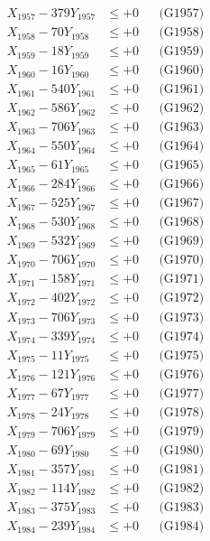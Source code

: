 \documentclass[a4paper,10pt]{article}
\begin{document}
{\begin{align}
X_{1957} - 379Y_{1957} &\leq +0 && \text{(G1957)} \\
X_{1958} - 70Y_{1958} &\leq +0 && \text{(G1958)} \\
X_{1959} - 18Y_{1959} &\leq +0 && \text{(G1959)} \\
X_{1960} - 16Y_{1960} &\leq +0 && \text{(G1960)} \\
\allowbreak
X_{1961} - 540Y_{1961} &\leq +0 && \text{(G1961)} \\
X_{1962} - 586Y_{1962} &\leq +0 && \text{(G1962)} \\
X_{1963} - 706Y_{1963} &\leq +0 && \text{(G1963)} \\
X_{1964} - 550Y_{1964} &\leq +0 && \text{(G1964)} \\
X_{1965} - 61Y_{1965} &\leq +0 && \text{(G1965)} \\
X_{1966} - 284Y_{1966} &\leq +0 && \text{(G1966)} \\
X_{1967} - 525Y_{1967} &\leq +0 && \text{(G1967)} \\
X_{1968} - 530Y_{1968} &\leq +0 && \text{(G1968)} \\
X_{1969} - 532Y_{1969} &\leq +0 && \text{(G1969)} \\
X_{1970} - 706Y_{1970} &\leq +0 && \text{(G1970)} \\
\allowbreak
X_{1971} - 158Y_{1971} &\leq +0 && \text{(G1971)} \\
X_{1972} - 402Y_{1972} &\leq +0 && \text{(G1972)} \\
X_{1973} - 706Y_{1973} &\leq +0 && \text{(G1973)} \\
X_{1974} - 339Y_{1974} &\leq +0 && \text{(G1974)} \\
X_{1975} - 11Y_{1975} &\leq +0 && \text{(G1975)} \\
X_{1976} - 121Y_{1976} &\leq +0 && \text{(G1976)} \\
X_{1977} - 67Y_{1977} &\leq +0 && \text{(G1977)} \\
X_{1978} - 24Y_{1978} &\leq +0 && \text{(G1978)} \\
X_{1979} - 706Y_{1979} &\leq +0 && \text{(G1979)} \\
X_{1980} - 69Y_{1980} &\leq +0 && \text{(G1980)} \\
\allowbreak
X_{1981} - 357Y_{1981} &\leq +0 && \text{(G1981)} \\
X_{1982} - 114Y_{1982} &\leq +0 && \text{(G1982)} \\
X_{1983} - 375Y_{1983} &\leq +0 && \text{(G1983)} \\
X_{1984} - 239Y_{1984} &\leq +0 && \text{(G1984)} \\

\end{align}}
\end{document}
